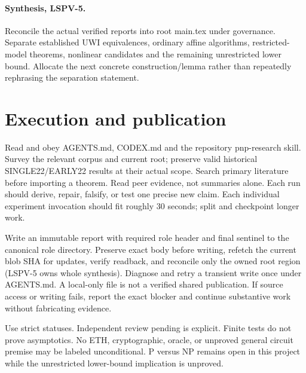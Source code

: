 \documentclass[11pt]{article}
\begin{document}
\paragraph{Synthesis, LSPV-5.} Reconcile the actual verified reports into root main.tex under governance. Separate established UWI equivalences, ordinary affine algorithms, restricted-model theorems, nonlinear candidates and the remaining unrestricted lower bound. Allocate the next concrete construction/lemma rather than repeatedly rephrasing the separation statement.
\section*{Execution and publication}
Read and obey AGENTS.md, CODEX.md and the repository pnp-research skill. Survey the relevant corpus and current root; preserve valid historical SINGLE22/EARLY22 results at their actual scope. Search primary literature before importing a theorem. Read peer evidence, not summaries alone. Each run should derive, repair, falsify, or test one precise new claim. Each individual experiment invocation should fit roughly 30 seconds; split and checkpoint longer work.

Write an immutable report with required role header and final sentinel to the canonical role directory. Preserve exact body before writing, refetch the current blob SHA for updates, verify readback, and reconcile only the owned root region (LSPV-5 owns whole synthesis). Diagnose and retry a transient write once under AGENTS.md. A local-only file is not a verified shared publication. If source access or writing fails, report the exact blocker and continue substantive work without fabricating evidence.

Use strict statuses. Independent review pending is explicit. Finite tests do not prove asymptotics. No ETH, cryptographic, oracle, or unproved general circuit premise may be labeled unconditional. P versus NP remains open in this project while the unrestricted lower-bound implication is unproved.
\end{document}

